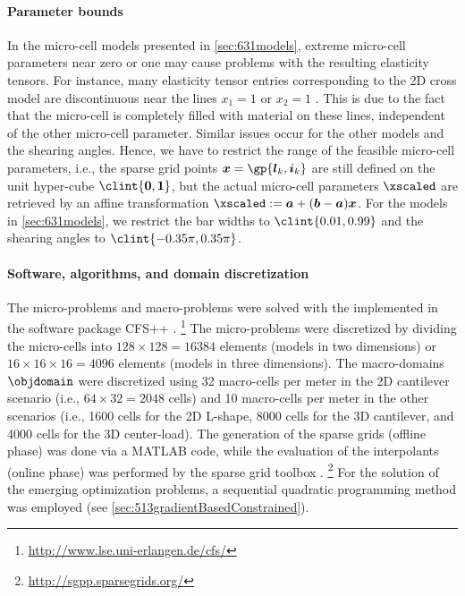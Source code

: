 \paragraph{Parameter bounds}

In the micro-cell models presented in \cref{sec:631models},
extreme micro-cell parameters near zero or one may cause problems
with the resulting elasticity tensors.
For instance, many elasticity tensor entries corresponding to
the 2D cross model are discontinuous near the lines $x_1 = 1$ or $x_2 = 1$
.
This is due to the fact that the micro-cell is completely filled with material
on these lines,
independent of the other micro-cell parameter.
Similar issues occur for the other models and the shearing angles.
Hence, we have to restrict the range of the feasible micro-cell parameters,
i.e., the sparse grid points
$\*x = \gp{\*l_k,\*i_k}$ are still defined on the unit hyper-cube
$\clint{\*0, \*1}$,
but the actual micro-cell parameters $\xscaled$ are retrieved by an
affine transformation $\xscaled := \*a + (\*b - \*a) \*x$.
For the models in \cref{sec:631models},
we restrict the bar widths to $\clint{0.01, 0.99}$ and
the shearing angles to $\clint{-0.35\pi, 0.35\pi}$.

\paragraph{Software, algorithms, and domain discretization}

The micro-problems and macro-problems were solved with the \fem
implemented in the \fem software package CFS++ \cite{Kaltenbacher10Advanced}.%
\footnote{%
  \url{http://www.lse.uni-erlangen.de/cfs/}%
}
The micro-problems were discretized by dividing the micro-cells into
$128 \times 128 = \num{16384}$ elements (models in two dimensions) or
$16 \times 16 \times 16 = \num{4096}$ elements (models in three dimensions).
The macro-domains $\objdomain$ were discretized using
32 macro-cells per meter in the 2D cantilever scenario
(i.e., $64 \times 32 = 2048$ cells) and
10 macro-cells per meter in the other scenarios
(i.e.,
\num{1600} cells for the 2D L-shape,
\num{8000} cells for the 3D cantilever, and
\num{4000} cells for the 3D center-load).
The generation of the sparse grids (offline phase) was done via a MATLAB code,
while the evaluation of the interpolants (online phase) was performed
by the sparse grid toolbox \sgpp \cite{Pflueger10Spatially}.%
\footnote{%
  \url{http://sgpp.sparsegrids.org/}%
}
For the solution of the emerging optimization problems,
a sequential quadratic programming method was employed
(see \cref{sec:513gradientBasedConstrained}).



